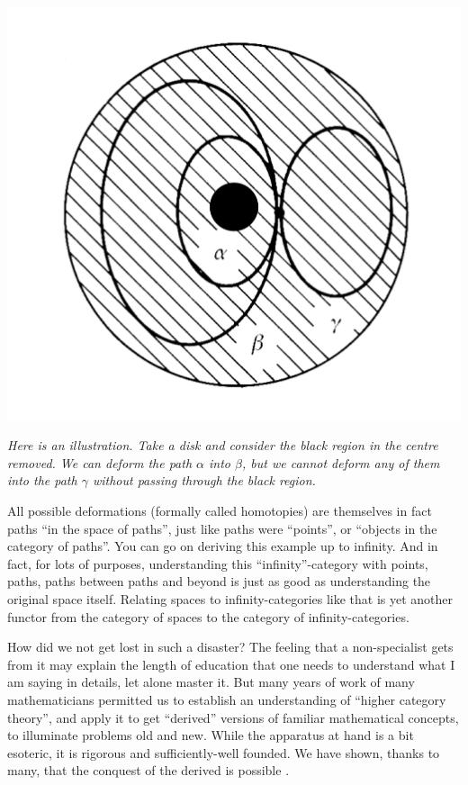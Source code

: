\documentclass{article}
\begin{document}
\begin{center}
\includegraphics[scale=0.5]{paths}

\textit{Here is an illustration. Take a disk and consider the black region in the centre removed. We can deform the path $\alpha$  into $\beta$, but we cannot deform any of them into the path $\gamma$ without passing through the black region.}
\end{center}

All possible deformations (formally called homotopies) are themselves in fact paths “in the space of paths”, just like paths were “points”, or “objects in the category of paths”. You can go on deriving this example up to infinity. And in fact, for lots of purposes, understanding this “infinity”-category with points, paths, paths between paths and beyond is just as good as understanding the original space itself. Relating spaces to infinity-categories like that is yet another functor from the category of spaces to the category of infinity-categories.

How did we not get lost in such a disaster? The feeling that a non-specialist gets from it may explain the length of education that one needs to understand what I am saying in details, let alone master it. But many years of work of many mathematicians permitted us to establish an understanding of “higher category theory”, and apply it to get “derived” versions of familiar mathematical concepts, to illuminate problems old and new. While the apparatus at hand is a bit esoteric, it is rigorous and sufficiently-well founded. We have shown, thanks to many, that the conquest of the derived is possible \cite{LURIE}.
\end{document}
